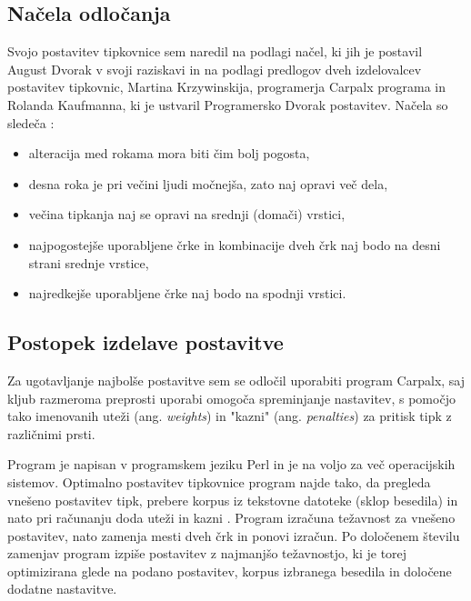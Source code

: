 

    \subsection{Načela odločanja}\label{subsec:načela-odločanja}

    Svojo postavitev tipkovnice sem naredil na podlagi načel, ki jih je postavil August Dvorak v svoji raziskavi
    in na podlagi predlogov dveh izdelovalcev postavitev tipkovnic, Martina Krzywinskija,
    programerja Carpalx programa in Rolanda Kaufmanna, ki je ustvaril Programersko Dvorak postavitev.
    Načela so sledeča \cite{roland_mail}:

    \begin{itemize}
        \item alteracija med rokama mora biti čim bolj pogosta,
        \item desna roka je pri večini ljudi močnejša, zato naj opravi več dela,
        \item večina tipkanja naj se opravi na srednji (domači) vrstici,
        \item najpogostejše uporabljene črke in kombinacije dveh črk naj bodo na desni strani srednje vrstice,
        \item najredkejše uporabljene črke naj bodo na spodnji vrstici.
    \end{itemize}

    \subsection{Postopek izdelave postavitve}\label{subsec:postopek-izdelave-postavitve}

    Za ugotavljanje najbolše postavitve sem se odločil uporabiti program Carpalx,
    saj kljub razmeroma preprosti uporabi omogoča spreminjanje nastavitev,
    s pomočjo tako imenovanih uteži (ang. \emph{weights}) in "kazni" (ang. \emph{penalties}) za pritisk tipk z različnimi prsti.

    Program je napisan v programskem jeziku Perl in je na voljo za več operacijskih sistemov.
    Optimalno postavitev tipkovnice program najde tako, da pregleda vnešeno postavitev tipk,
    prebere korpus iz tekstovne datoteke (sklop besedila) in nato pri računanju doda uteži in kazni \cite{typing_effort}.
    Program izračuna težavnost za vnešeno postavitev, nato zamenja mesti dveh črk in ponovi izračun.
    Po določenem številu zamenjav program izpiše postavitev z najmanjšo težavnostjo,
    ki je torej optimizirana glede na podano postavitev, korpus izbranega besedila in določene dodatne nastavitve.


